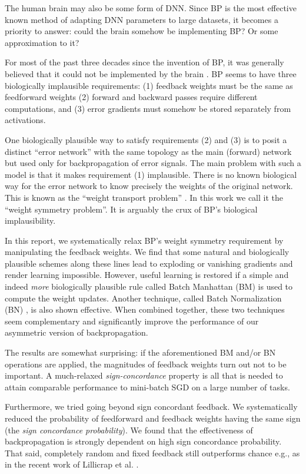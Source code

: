 \documentclass[letterpaper]{article}
\begin{document}
The human brain may also be some form of DNN. Since BP is the most effective known method of adapting DNN parameters to large datasets, it becomes a priority to answer: could the brain somehow be implementing BP? Or some approximation to it? 

For most of the past three decades since the invention of BP, it was generally believed that it could not be implemented by the brain   \cite{crick1989recent,mazzoni1991more,o1996biologically,chinta2012adaptive,bengio2015towards}.  BP seems to have three biologically implausible requirements: (1) feedback weights must be the same as feedforward weights (2) forward and backward passes require different computations, and (3) error gradients must somehow be stored separately from activations. 

One biologically plausible way to satisfy requirements (2) and (3) is to posit a distinct ``error network'' with the same topology as the main (forward) network but used only for backpropagation of error signals. The main problem with such a model is that it makes requirement (1) implausible. There is no known biological way for the error network to know precisely the weights of the original network. This is known as the ``weight transport problem'' \cite{grossberg1987competitive}. In this work we call it the ``weight symmetry problem''. It is arguably the crux of BP's biological implausibility. 

In this report, we systematically relax BP's weight symmetry requirement by manipulating the feedback weights. We find that some natural and biologically plausible schemes along these lines lead to exploding or vanishing gradients and render learning impossible. However, useful learning is restored if a simple and indeed \emph{more} biologically plausible rule called Batch Manhattan (BM) is used to compute the weight updates. Another technique, called Batch Normalization (BN) \cite{ioffe2015batch}, is also shown effective. When combined together, these two techniques seem complementary and significantly improve the performance of our asymmetric version of backpropagation.

The results are somewhat surprising: if the aforementioned BM and/or BN operations are applied, the magnitudes of feedback weights turn out not to be important.  A much-relaxed \emph{sign-concordance} property is all that is needed to attain comparable performance to mini-batch SGD on a large number of tasks.

Furthermore, we tried going beyond sign concordant feedback. We systematically reduced the probability of feedforward and feedback weights having the same sign (the \emph{sign concordance probability}). We found that the effectiveness of backpropagation is strongly dependent on high sign concordance probability. That said, completely random and fixed feedback still outperforms chance e.g., as in the recent work of Lillicrap et al. \cite{lillicrap2014random}.
\end{document}
